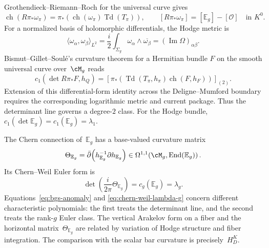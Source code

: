 Grothendieck--Riemann--Roch for the universal curve gives
\begin{equation}
 \operatorname{ch}(R\pi_*\omega_\pi)
 =\pi_*\!\left(\operatorname{ch}(\omega_\pi)
 \operatorname{Td}(T_\pi)\right),
 \qquad
 [R\pi_*\omega_\pi]=[\mathbb E_g]-[\mathcal O]
 \quad\text{in }K^0.
 \label{eq:grr-hodge}
\end{equation}
For a normalized basis of holomorphic differentials, the Hodge metric
is
\begin{equation}
 \langle\omega_\alpha,\omega_\beta\rangle_{L^2}
 =\frac{i}{2}\int_{\Sigma_g}
 \omega_\alpha\wedge\overline{\omega_\beta}
 =(\operatorname{Im}\Omega)_{\alpha\beta}.
 \label{eq:arakelov-l2-inner-product}
\end{equation}
Bismut--Gillet--Soul\'e's curvature theorem for a Hermitian bundle
$F$ on the smooth universal curve over~$\cM_g$ reads
\begin{equation}
 c_1\!\left(\det R\pi_*F,h_Q\right)
 =\left[
 \pi_*\!\left(\operatorname{Td}(T_\pi,h_\pi)
 \operatorname{ch}(F,h_F)\right)
 \right]_{(2)}.
 \label{eq:bgs-anomaly}
\end{equation}
Extension of this differential-form identity across the
Deligne--Mumford boundary requires the corresponding logarithmic
metric and current package.
Thus the determinant line governs a degree-$2$ class.  For the Hodge
bundle, $c_1(\det\mathbb E_g)=c_1(\mathbb E_g)=\lambda_1$.

The Chern connection of~$\mathbb E_g$ has a base-valued curvature
matrix
\begin{equation}
 \Theta_{\mathbb E_g}
 =\bar\partial\!\left(h_{\mathbb E_g}^{-1}
 \partial h_{\mathbb E_g}\right)
 \in\Omega^{1,1}\!\left(\cM_g,\operatorname{End}(\mathbb E_g)\right).
 \label{eq:arakelov-curvature-identification}
\end{equation}
Its Chern--Weil Euler form is
\begin{equation}
 \det\!\left(\frac{i}{2\pi}\Theta_{\mathbb E_g}\right)
 =c_g(\mathbb E_g)=\lambda_g.
 \label{eq:chern-weil-lambda-g}
\end{equation}
Equations~\eqref{eq:bgs-anomaly} and
\eqref{eq:chern-weil-lambda-g} concern different characteristic
polynomials: the first treats the determinant line, and the second
treats the rank-$g$ Euler class.  The vertical Arakelov form on a
fiber and the horizontal matrix~$\Theta_{\mathbb E_g}$ are related by
variation of Hodge structure and fiber integration.  The comparison
with the scalar bar curvature is precisely~$H_D^K$.

